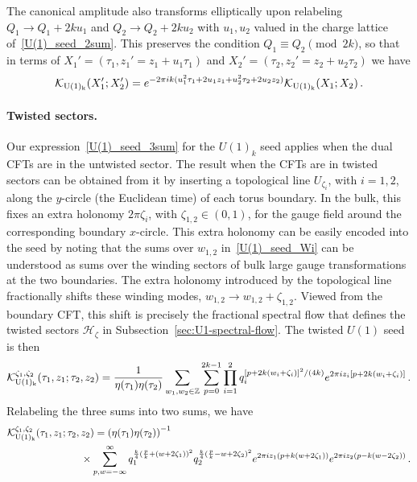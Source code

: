 \documentclass[11pt]{article}
\numberwithin{equation}{section}
\begin{document}
The canonical amplitude also transforms elliptically upon relabeling $Q_{1} \to Q_{1}+2ku_1$ and $Q_2\to Q_2 + 2ku_2$ with $u_{1},u_2$ valued in the charge lattice of~\eqref{U(1)_seed_2sum}. This preserves the condition $Q_{1}\equiv Q_{2}\pmod{2k}$, so that in terms of $X_1'=(\tau_1,z_1'=z_1 + u_1 \tau_1)$ and $X_2' = (\tau_2,z_2'=z_2+u_2\tau_2)$ we have
\begin{equation}
\mathcal K_{\rm U(1)_k}(X_1';X_2')
 =e^{-2\pi i k(u_1^2\tau_1+2u_1 z_1+u_2^2\tau_2+2u_2z_2)}
 \mathcal K_{\rm U(1)_k}(X_1;X_2)\,.
\label{eq:U1-paired-elliptic}
\end{equation}

\paragraph{Twisted sectors.} Our expression~\eqref{U(1)_seed_3sum} for the $U(1)_k$ seed applies when the dual CFTs are in the untwisted sector. The result when the CFTs are in twisted sectors can be obtained from it by inserting a topological line $U_{\zeta_{i}}$, with $i=1,2$, along the $y$-circle (the Euclidean time) of each torus boundary. In the bulk, this fixes an extra holonomy $2\pi\zeta_i$, with $\zeta_{1,2}\in (0,1)$, for the gauge field around the corresponding boundary $x$-circle. This extra holonomy can be easily encoded into the seed by noting that the sums over $w_{1,2}$ in~\eqref{U(1)_seed_Wi} can be understood as sums over the winding sectors of bulk large gauge transformations at the two boundaries. The extra holonomy introduced by the topological line fractionally shifts these winding modes, $w_{1,2} \rightarrow w_{1,2}+\zeta_{1,2}$. Viewed from the boundary CFT, this shift is precisely the fractional spectral flow that defines the twisted sectors $\mathcal{H}_{\zeta}$ in Subsection~\ref{sec:U1-spectral-flow}. The twisted $U(1)$ seed is then
\begin{equation}
 \mathcal K_{\rm U(1)_k}^{\zeta_1,\zeta_2}(\tau_1,z_1;\tau_2,z_2)=\frac{1}{\eta(\tau_1)\eta(\tau_2)}
 \sum_{w_1,w_2\in\mathbb Z}\sum_{p=0}^{2k-1}
 \prod_{i=1}^2 q_i^{[p+2k(w_i+\zeta_i)]^2/(4k)}
 e^{2\pi i z_i[p+2k(w_i+\zeta_i)]}\,.
\label{U(1)_seed_3sum_twisted}
\end{equation}
Relabeling the three sums into two sums, we have
\begin{align}
\begin{split}
    & \mathcal K_{\rm U(1)_k}^{\zeta_1,\zeta_2}(\tau_1,z_1;\tau_2,z_2)=\left(\eta(\tau_1)\eta(\tau_{2})\right)^{-1}   \\
     &\hspace{1in}\times\sum_{p,w=-\infty}^{\infty}q_1^{\frac{k}{4}(\frac{p}{k}+(w+2\zeta_1))^2}q_2^{\frac{k}{4}(\frac{p}{k}-w+2\zeta_2)^2}e^{2\pi i z_1(p+k(w+2\zeta_1))}e^{2\pi i z_2(p-k(w-2\zeta_2))}\,.
     \label{U(1)_seed_twisted}
\end{split}
\end{align}
\end{document}
